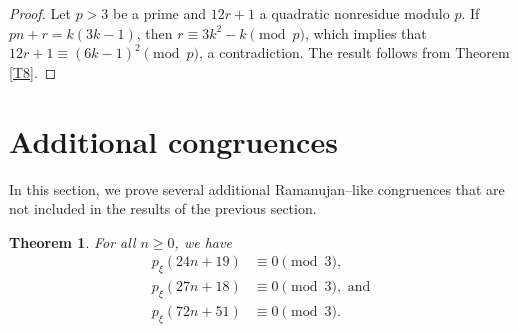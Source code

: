 \documentclass[12pt]{article}
\newtheorem{theorem}{Theorem}[section]
\begin{document}
\begin{proof}
Let $p>3$ be a prime and $12r+1$ a quadratic nonresidue modulo $p$. If $pn+r = k(3k-1)$, then $r \equiv 3k^2-k \pmod{p}$, which implies that $12r+1 \equiv (6k-1)^2 \pmod{p}$, a contradiction. The result follows from Theorem \ref{T8}.
\end{proof}



\section{Additional congruences}
\label{sec:addl_congs}

In this section, we prove several additional Ramanujan--like congruences that are not included in the results of the previous section.

\begin{theorem} For all $n \geq 0$, we have
\begin{align}
p_{\xi}(24n+19) & \equiv 0 \pmod{3}, \label{Eq12} \\ 
p_{\xi}(27n+18) & \equiv 0 \pmod{3}, \textrm{\ \ and} \label{Eq13} \\
p_{\xi}(72n+51) & \equiv 0 \pmod{3}. \label{Eq14}
\end{align}
\label{T5}
\end{theorem}
\end{document}
